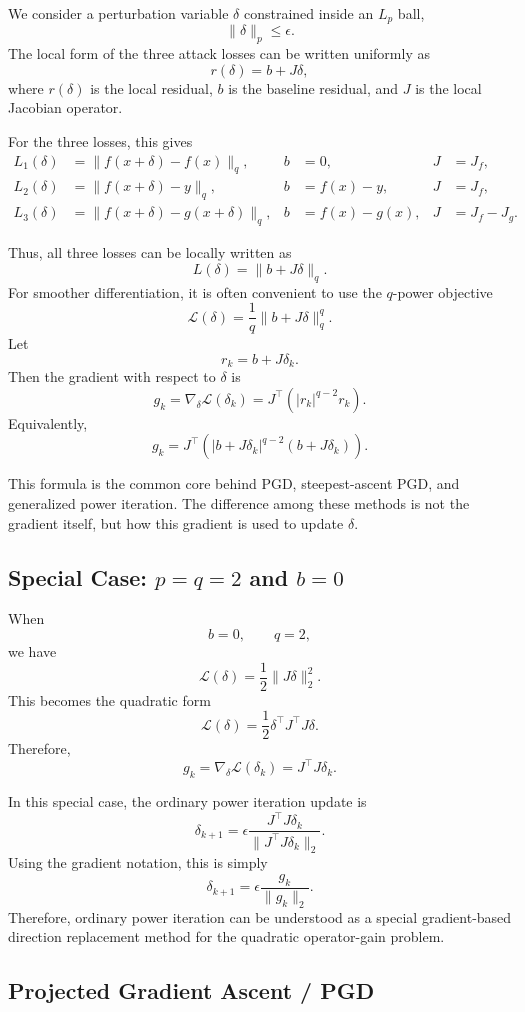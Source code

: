 \documentclass{article}
\begin{document}
We consider a perturbation variable $\delta$ constrained inside an $L_p$ ball,
\[
\|\delta\|_p \le \epsilon.
\]
The local form of the three attack losses can be written uniformly as
\[
r(\delta)=b+J\delta,
\]
where $r(\delta)$ is the local residual, $b$ is the baseline residual, and $J$ is the local Jacobian operator.

For the three losses, this gives
\[
\begin{aligned}
L_1(\delta)&=\|f(x+\delta)-f(x)\|_q,
&
b&=0,
&
J&=J_f,
\\
L_2(\delta)&=\|f(x+\delta)-y\|_q,
&
b&=f(x)-y,
&
J&=J_f,
\\
L_3(\delta)&=\|f(x+\delta)-g(x+\delta)\|_q,
&
b&=f(x)-g(x),
&
J&=J_f-J_g.
\end{aligned}
\]

Thus, all three losses can be locally written as
\[
L(\delta)=\|b+J\delta\|_q.
\]
For smoother differentiation, it is often convenient to use the $q$-power objective
\[
\mathcal{L}(\delta)
=
\frac{1}{q}\|b+J\delta\|_q^q.
\]
Let
\[
r_k=b+J\delta_k.
\]
Then the gradient with respect to $\delta$ is
\[
g_k
=
\nabla_\delta \mathcal{L}(\delta_k)
=
J^\top\left(|r_k|^{q-2}r_k\right).
\]
Equivalently,
\[
g_k
=
J^\top\left(
|b+J\delta_k|^{q-2}(b+J\delta_k)
\right).
\]

This formula is the common core behind PGD, steepest-ascent PGD, and generalized power iteration. The difference among these methods is not the gradient itself, but how this gradient is used to update $\delta$.

\subsection{Special Case: $p=q=2$ and $b=0$}

When
\[
b=0,
\qquad
q=2,
\]
we have
\[
\mathcal{L}(\delta)
=
\frac{1}{2}\|J\delta\|_2^2.
\]
This becomes the quadratic form
\[
\mathcal{L}(\delta)
=
\frac{1}{2}\delta^\top J^\top J\delta.
\]
Therefore,
\[
g_k
=
\nabla_\delta \mathcal{L}(\delta_k)
=
J^\top J\delta_k.
\]

In this special case, the ordinary power iteration update is
\[
\delta_{k+1}
=
\epsilon
\frac{J^\top J\delta_k}
{\|J^\top J\delta_k\|_2}.
\]
Using the gradient notation, this is simply
\[
\delta_{k+1}
=
\epsilon
\frac{g_k}{\|g_k\|_2}.
\]
Therefore, ordinary power iteration can be understood as a special gradient-based direction replacement method for the quadratic operator-gain problem.

\subsection{Projected Gradient Ascent / PGD}
\end{document}
